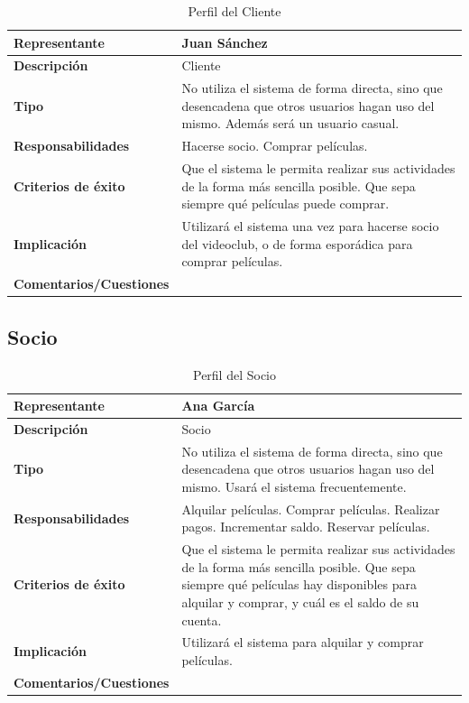 \begin{table}[H]
\centering
\begin{tabular}{|p{5cm}|p{10cm}|}
\hline
\rowcolor[HTML]{CFE2F3} 
\textbf{Representante} & Juan Sánchez \\ \hline
\textbf{Descripción} & Cliente \\ \hline
\textbf{Tipo} & No utiliza el sistema de forma directa, sino que desencadena que otros usuarios hagan uso del mismo. Además será un usuario casual. \\ \hline
\textbf{Responsabilidades} & Hacerse socio. Comprar películas. \\ \hline
\textbf{Criterios de éxito} & Que el sistema le permita realizar sus actividades de la forma más sencilla posible. Que sepa siempre qué películas puede comprar. \\ \hline
\textbf{Implicación} & Utilizará el sistema una vez para hacerse socio del videoclub, o de forma esporádica para comprar películas. \\ \hline
\textbf{Comentarios/Cuestiones} & \\ \hline
\end{tabular}
\caption{Perfil del Cliente}
\label{tab:perfil_cliente}
\end{table}

\subsection*{Socio}

\begin{table}[H]
\centering
\begin{tabular}{|p{5cm}|p{10cm}|}
\hline
\rowcolor[HTML]{CFE2F3} 
\textbf{Representante} & Ana García \\ \hline
\textbf{Descripción} & Socio \\ \hline
\textbf{Tipo} & No utiliza el sistema de forma directa, sino que desencadena que otros usuarios hagan uso del mismo. Usará el sistema frecuentemente. \\ \hline
\textbf{Responsabilidades} & Alquilar películas. Comprar películas. Realizar pagos. Incrementar saldo. Reservar películas. \\ \hline
\textbf{Criterios de éxito} & Que el sistema le permita realizar sus actividades de la forma más sencilla posible. Que sepa siempre qué películas hay disponibles para alquilar y comprar, y cuál es el saldo de su cuenta. \\ \hline
\textbf{Implicación} & Utilizará el sistema para alquilar y comprar películas. \\ \hline
\textbf{Comentarios/Cuestiones} & \\ \hline
\end{tabular}
\caption{Perfil del Socio}
\label{tab:perfil_socio}
\end{table}

